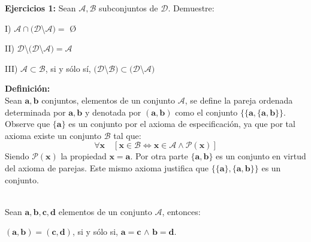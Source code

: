\newpage
\textbf{Ejercicios 1:} Sean $\mathcal{A,B}$ subconjuntos de $\mathcal{D}$. Demuestre:
\begin{iteritem}
\item   I) $\mathcal{A}\cap(\mathcal{D}$\textbackslash$\mathcal{A})=$ \O
\item  II) $\mathcal{D}$\textbackslash$(\mathcal{D}$\textbackslash$\mathcal{A})=\mathcal{A}$
\item III) $\mathcal{A}\subset\mathcal{B}$, si y sólo sí, $(\mathcal{D}$\textbackslash$\mathcal{B})\subset(\mathcal{D}$\textbackslash$\mathcal{A})$\\
\end{iteritem}

\textbf{Definición:}\\ 
Sean $\mathbf{a,b}$ conjuntos, elementos de un conjunto $\mathcal{A}$, se define la pareja ordenada determinada por $\mathbf{a,b}$ y denotada por $(\mathbf{a,b})$ como el conjunto $\{\{\mathbf{a},\{\mathbf{a,b}\}\}$.\\

Observe que $\{\mathbf{a}\}$ es un conjunto por el axioma de especificación, ya que por tal axioma existe un conjunto $\mathcal{B}$ tal que:
\[\forall\mathbf{x}\quad[\mathbf{x}\in\mathcal{B} \Longleftrightarrow \mathbf{x}\in\mathcal{A} \wedge \mathcal{P}(\mathbf{x}) ]\] 
Siendo $\mathcal{P}(\mathbf{x})$ la propiedad $\mathbf{x}=\mathbf{a}$. Por otra parte $\{\mathbf{a,b}\}$ es un conjunto en virtud del axioma de parejas. Este mismo axioma justifica que $\{\{\mathbf{a}\},\{\mathbf{a,b}\}\}$ es un conjunto. \\

\begin{proposition}
	\\
	Sean $\mathbf{a,b,c,d}$ elementos de un conjunto $\mathcal{A}$, entonces:
	\begin{center}
	$(\mathbf{a},\mathbf{b})=(\mathbf{c},\mathbf{d})$, si y sólo si, $\mathbf{a}=\mathbf{c}$ $\wedge$ $\mathbf{b}=\mathbf{d}$.
	\end{center}
\end{proposition}

